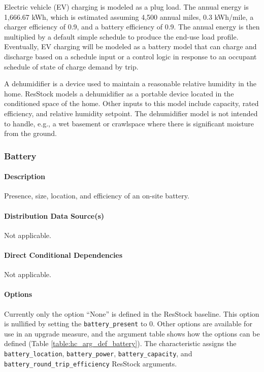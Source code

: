 Electric vehicle (EV) charging is modeled as a plug load. The annual energy is 1,666.67 kWh, which is estimated assuming 4,500 annual miles, 0.3 kWh/mile, a charger efficiency of 0.9, and a battery efficiency of 0.9. The annual energy is then multiplied by a default simple schedule to produce the end-use load profile. Eventually, EV charging will be modeled as a battery model that can charge and discharge based on a schedule input or a control logic in response to an occupant schedule of state of charge demand by trip.

A dehumidifier is a device used to maintain a reasonable relative humidity in the home. ResStock models a dehumidifier as a portable device located in the conditioned space of the home. Other inputs to this model include capacity, rated efficiency, and relative humidity setpoint. The dehumidifier model is not intended to handle, e.g., a wet basement or crawlspace where there is significant moisture from the ground.

\subsubsection{Battery}
\paragraph{Description}
Presence, size, location, and efficiency of an on-site battery.

\paragraph{Distribution Data Source(s)}
Not applicable.

\paragraph{Direct Conditional Dependencies}
Not applicable.

\paragraph{Options}
Currently only the option ``None'' is defined in the ResStock baseline. This option is nullified by setting the \texttt{battery\_present} to 0. Other options are available for use in an upgrade measure, and the argument table shows how the options can be defined (Table \ref{table:hc_arg_def_battery}). The characteristic assigns the \texttt{battery\_location}, \texttt{battery\_power}, \texttt{battery\_capacity}, and \texttt{battery\_round\_trip\_efficiency} ResStock arguments.


